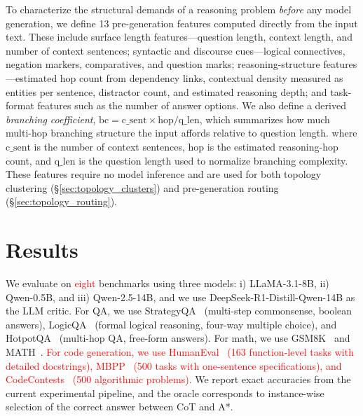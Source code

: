 \documentclass[10pt]{article}
\begin{document}
To characterize the structural demands of a reasoning problem \emph{before} any model generation, we define 13 pre-generation features computed directly from the input text. These include surface length features---question length, context length, and number of context sentences; syntactic and discourse cues---logical connectives, negation markers, comparatives, and question marks; reasoning-structure features---estimated hop count from dependency links, contextual density measured as entities per sentence, distractor count, and estimated reasoning depth; and task-format features such as the number of answer options. We also define a derived \emph{branching coefficient}, $\mathrm{bc}=\mathrm{c\_sent}\times \mathrm{hop}/\mathrm{q\_len}$, which summarizes how much multi-hop branching structure the input affords relative to question length. 
where $\mathrm{c\_sent}$ is the number of context sentences, $\mathrm{hop}$ is the estimated reasoning-hop count, and $\mathrm{q\_len}$ is the question length used to normalize branching complexity.
These features require no model inference and are used for both topology clustering (\S\ref{sec:topology_clusters}) and pre-generation routing (\S\ref{sec:topology_routing}).




\section{Results}
\label{sec:results}

We evaluate on \textcolor{red}{eight} benchmarks using three models: i) LLaMA-3.1-8B, ii) Qwen-0.5B, and iii) Qwen-2.5-14B, and we use DeepSeek-R1-Distill-Qwen-14B as the LLM critic. For QA, we use StrategyQA~\cite{geva2021did} (multi-step commonsense, boolean answers), LogicQA~\cite{liu2020logiqa} (formal logical reasoning, four-way multiple choice), and HotpotQA~\cite{yang2018hotpotqa} (multi-hop QA, free-form answers). For math, we use GSM8K~\cite{cobbe2021trainingverifierssolvemath} and MATH~\cite{hendrycks2021measuringmathematicalproblemsolving}. \textcolor{red}{For code generation, we use HumanEval~\cite{chen2021humaneval} (163 function-level tasks with detailed docstrings), MBPP~\cite{austin2021mbpp} (500 tasks with one-sentence specifications), and CodeContests~\cite{li2022codecontests} (500 algorithmic problems).} We report exact accuracies from the current experimental pipeline, and the oracle corresponds to instance-wise selection of the correct answer between CoT and A*.
\end{document}
